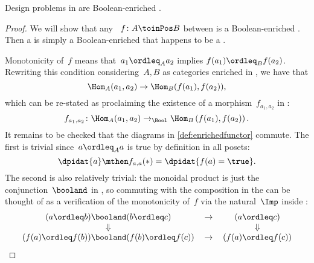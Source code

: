 \begin{proposition}
    Design problems in \DP are Boolean-enriched .
\end{proposition}
\begin{proof}
    We will show that any ~$f\colon A \toinPos B$ between  is a Boolean-enriched .
    Then a  is simply a Boolean-enriched  that happens to be a .

    Monotonicity of~$f$ means that~$a_1 \ordleq_A a_2$ implies $f(a_1) \ordleq_B f(a_2)$.
    Rewriting this condition considering~$A, B$ as categories enriched in \Bool, we have that
    \begin{equation}
        \Hom_A(a_1, a_2) \to \Hom_B(f(a_1), f(a_2)),
    \end{equation}
    which can be re-stated as proclaiming the existence of a morphism~$f_{a_1, a_2}$ in \Bool:
    \begin{equation}
        f_{a_1, a_2} \colon \Hom_A(a_1, a_2) \to_{\Bool} \Hom_B\left(f(a_1), f(a_2)\right).
    \end{equation}
    It remains to be checked that the diagrams in \cref{def:enrichedfunctor} commute.
    The first is trivial since~$a \ordleq_A a$ is true by definition in all posets:
    \begin{equation}
        \dpidat{a} \mthen f_{a,a} (\ast) = \dpidat{f(a) = \true}.
    \end{equation}
    The second is also relatively trivial: the monoidal product is just the conjunction~$\booland$ in \Bool, so commuting with the composition in the  can be thought of as a verification of the monotonicity of~$f$ via the natural~$\Imp$ inside \Bool:
    \begin{equation}
        \begin{tabular}{ccc}
            $(a \ordleq b) \booland (b \ordleq c)$             & $\to$ & $(a \ordleq c)$ \\
            $\Downarrow$                                       &       & $\Downarrow$ \\
            $(f(a) \ordleq f(b)) \booland (f(b) \ordleq f(c))$ & $\to$ & $(f(a) \ordleq f(c))$
        \end{tabular}
    \end{equation}
\end{proof}

